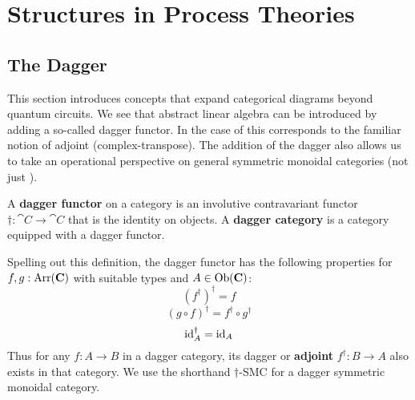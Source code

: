 \chapter{Structures in Process Theories}
\label{chap:cqm}


\section{The Dagger}
This section introduces concepts that expand categorical diagrams beyond quantum circuits. We see that abstract linear algebra can be introduced by adding a so-called dagger functor.  In the case of  this corresponds to the familiar notion of adjoint (complex-transpose).  The addition of the dagger also allows us to take an operational perspective on general symmetric monoidal categories (not just ). 

\begin{defn}
\label{defn:dagger}
A \textbf{dagger functor} on a category  is an involutive contravariant functor $\dagger:\cat{C}\to\cat{C}$ that is the identity on objects. A \textbf{dagger category} is a category equipped with a dagger functor.
\end{defn}
Spelling out this definition, the dagger functor has the following properties for $f,g:\mbox{Arr}(\mathbf{C})$ with suitable types and $A\in\mbox{Ob}(\mathbf{C})$:
\begin{equation}
\left(f^{\dagger}\right)^{\dagger} = f 
\end{equation}
\begin{equation}
(g\circ f)^{\dagger} = f^{\dagger}\circ g^{\dagger}
\end{equation}
\begin{equation}
\mbox{id}_{A}^{\dagger} = \mbox{id}_{A}
\end{equation}
Thus for any $f:A\to B$ in a dagger category, its dagger or \textbf{adjoint} $f^{\dagger}:B\to A$ also exists in that category. We use the shorthand $\dagger$-SMC for a dagger symmetric monoidal category.

